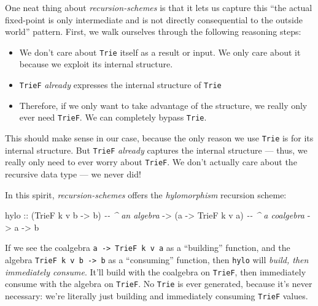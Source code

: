 \documentclass[]{article}
\newenvironment{Shaded}{}{}
\newcommand{\CommentTok}[1]{\textcolor[rgb]{0.38,0.63,0.69}{\textit{#1}}}
\newcommand{\DataTypeTok}[1]{\textcolor[rgb]{0.56,0.13,0.00}{#1}}
\newcommand{\NormalTok}[1]{#1}
\newcommand{\OtherTok}[1]{\textcolor[rgb]{0.00,0.44,0.13}{#1}}
\begin{document}
One neat thing about \emph{recursion-schemes} is that it lets us capture this
``the actual fixed-point is only intermediate and is not directly consequential
to the outside world'' pattern. First, we walk ourselves through the following
reasoning steps:

\begin{itemize}
\tightlist
\item
  We don't care about \texttt{Trie} itself as a result or input. We only care
  about it because we exploit its internal structure.
\item
  \texttt{TrieF} \emph{already} expresses the internal structure of
  \texttt{Trie}
\item
  Therefore, if we only want to take advantage of the structure, we really only
  ever need \texttt{TrieF}. We can completely bypass \texttt{Trie}.
\end{itemize}

This should make sense in our case, because the only reason we use \texttt{Trie}
is for its internal structure. But \texttt{TrieF} \emph{already} captures the
internal structure --- thus, we really only need to ever worry about
\texttt{TrieF}. We don't actually care about the recursive data type --- we
never did!

In this spirit, \emph{recursion-schemes} offers the \emph{hylomorphism}
recursion scheme:

\begin{Shaded}
\begin{Highlighting}[]
\NormalTok{hylo}
\OtherTok{    ::}\NormalTok{ (}\DataTypeTok{TrieF}\NormalTok{ k v b }\OtherTok{{-}\textgreater{}}\NormalTok{ b)   }\CommentTok{{-}{-} \^{} an algebra}
    \OtherTok{{-}\textgreater{}}\NormalTok{ (a }\OtherTok{{-}\textgreater{}} \DataTypeTok{TrieF}\NormalTok{ k v a)   }\CommentTok{{-}{-} \^{} a coalgebra}
    \OtherTok{{-}\textgreater{}}\NormalTok{ a}
    \OtherTok{{-}\textgreater{}}\NormalTok{ b}
\end{Highlighting}
\end{Shaded}

If we see the coalgebra \texttt{a\ -\textgreater{}\ TrieF\ k\ v\ a} as a
``building'' function, and the algebra
\texttt{TrieF\ k\ v\ b\ -\textgreater{}\ b} as a ``consuming'' function, then
\texttt{hylo} will \emph{build, then immediately consume}. It'll build with the
coalgebra on \texttt{TrieF}, then immediately consume with the algebra on
\texttt{TrieF}. No \texttt{Trie} is ever generated, because it's never
necessary: we're literally just building and immediately consuming
\texttt{TrieF} values.
\end{document}
